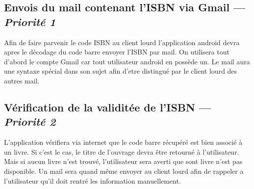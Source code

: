 \subsection[Envois du mail contenant l'ISBN via Gmail]{Envois du mail contenant l'ISBN via Gmail — \emph{Priorité 1}}
Afin de faire parvenir le code ISBN au client lourd l'application android devra apres le décodage du code barre envoyer l'ISBN par mail. On utilisera tout d'abord le compte Gmail car tout utilisateur android en possède un. Le mail aura une syntaxe spécial dans son sujet afin d'etre distingué par le client lourd des autres mail.


\subsection[Vérification de la validitée de l'ISBN]{Vérification de la validitée de l'ISBN — \emph{Priorité 2}}
L'application vérifiera via internet que le code barre récupéré est bien associé à un livre. Si c'est le cas, le titre de l'ouvrage devra être retourné à l'utilisateur. Mais si aucun livre n'est trouvé, l'utilisateur sera averti que sont livre n'est pas disponible. Un mail sera quand même envoyer au client lourd afin de rappeler a l'utilisateur qu'il doit rentré les information manuellement.
 


